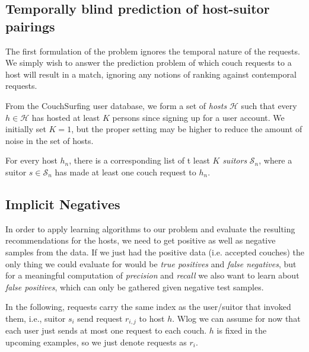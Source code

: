 \documentclass[11pt]{article}
\begin{document}
\subsection{Temporally blind prediction of host-suitor pairings}
The first formulation of the problem ignores the temporal nature of the requests.
We simply wish to answer the prediction problem of which couch requests to a host will result in a match, ignoring any notions of ranking against contemporal requests.

From the CouchSurfing user database, we form a set of \emph{hosts} $\mathcal{H}$ such that every $h \in \mathcal{H}$ has hosted at least $K$ persons since signing up for a user account.
We initially set $K=1$, but the proper setting may be higher to reduce the amount of noise in the set of hosts.

For every host $h_n$, there is a corresponding list of t least $K$ \emph{suitors} $\mathcal{S}_n$, where a suitor $s \in \mathcal{S}_n$ has made at least one couch request to $h_n$.

\subsection{Implicit Negatives}
\label{sec:implicitNeg}
In order to apply learning algorithms to our problem and evaluate the resulting recommendations for the hosts, we need to get positive as well as negative samples from the data. If we just had the positive data (i.e. accepted couches) the only thing we could evaluate for would be \textit{true positives} and \textit{false negatives}, but for a meaningful computation of \textit{precision} and \textit{recall} we also want to learn about \textit{false positives}, which can only be gathered given negative test samples.

In the following, requests carry the same index as the user/suitor that invoked them, i.e., suitor $s_i$ send request $r_{i,j}$ to host $h$. Wlog we can assume for now that each user just sends at most one request to each couch. $h$ is fixed in the upcoming examples, so we just denote requests as $r_i$.
 
\end{document}

